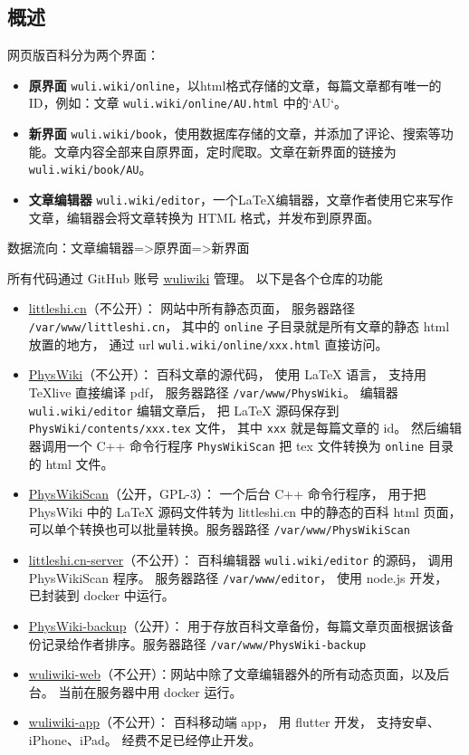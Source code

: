 
\subsection{概述}
网页版百科分为两个界面：
\begin{itemize}
\item \textbf{原界面} \verb`wuli.wiki/online`，以html格式存储的文章，每篇文章都有唯一的ID，例如：文章 \verb`wuli.wiki/online/AU.html` 中的`AU`。 
\item \textbf{新界面} \verb`wuli.wiki/book`，使用数据库存储的文章，并添加了评论、搜索等功能。文章内容全部来自原界面，定时爬取。文章在新界面的链接为 \verb`wuli.wiki/book/AU`。
\item \textbf{文章编辑器} \verb`wuli.wiki/editor`，一个LaTeX编辑器，文章作者使用它来写作文章，编辑器会将文章转换为 HTML 格式，并发布到原界面。
\end{itemize}
数据流向：文章编辑器=>原界面=>新界面

所有代码通过 GitHub 账号 \href{https://github.com/wuliwiki}{wuliwiki} 管理。 以下是各个仓库的功能
\begin{itemize}
\item \href{https://github.com/wuliwiki/littleshi.cn}{littleshi.cn}（不公开）： 网站中所有静态页面， 服务器路径 \verb`/var/www/littleshi.cn`， 其中的 \verb`online` 子目录就是所有文章的静态 html 放置的地方， 通过 url \verb`wuli.wiki/online/xxx.html` 直接访问。
\item \href{https://github.com/wuliwiki/PhysWiki}{PhysWiki}（不公开）： 百科文章的源代码， 使用 LaTeX 语言， 支持用 TeXlive 直接编译 pdf， 服务器路径 \verb`/var/www/PhysWiki`。 编辑器 \verb`wuli.wiki/editor` 编辑文章后， 把 LaTeX 源码保存到 \verb`PhysWiki/contents/xxx.tex` 文件， 其中 \verb`xxx` 就是每篇文章的 id。 然后编辑器调用一个 C++ 命令行程序 \verb`PhysWikiScan` 把 tex 文件转换为 \verb`online` 目录的 html 文件。
\item \href{https://github.com/wuliwiki/PhysWikiScan}{PhysWikiScan}（公开，GPL-3）： 一个后台 C++ 命令行程序， 用于把 PhysWiki 中的 LaTeX 源码文件转为 littleshi.cn 中的静态的百科 html 页面， 可以单个转换也可以批量转换。服务器路径 \verb`/var/www/PhysWikiScan`
\item \href{https://github.com/wuliwiki/littleshi.cn-server}{littleshi.cn-server}（不公开）： 百科编辑器 \verb`wuli.wiki/editor` 的源码， 调用 PhysWikiScan 程序。 服务器路径 \verb`/var/www/editor`， 使用 node.js 开发， 已封装到 docker 中运行。
\item \href{https://github.com/MacroUniverse/PhysWiki-backup}{PhysWiki-backup}（公开）： 用于存放百科文章备份，每篇文章页面根据该备份记录给作者排序。服务器路径 \verb`/var/www/PhysWiki-backup`
\item \href{https://github.com/MacroUniverse/wuliwiki-web}{wuliwiki-web}（不公开）：网站中除了文章编辑器外的所有动态页面，以及后台。 当前在服务器中用 docker 运行。
\item \href{https://github.com/MacroUniverse/wuliwiki-app}{wuliwiki-app}（不公开）： 百科移动端 app， 用 flutter 开发， 支持安卓、iPhone、iPad。 经费不足已经停止开发。
\end{itemize}

